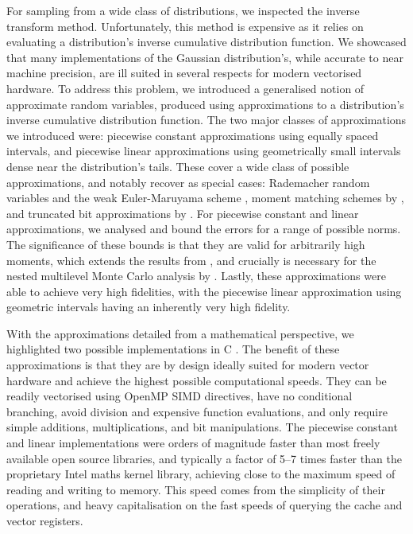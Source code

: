 \documentclass[manuscript,review]{acmart}
\begin{document}
For sampling from a wide class of distributions, we inspected the inverse transform method. Unfortunately, this method is expensive as it relies on evaluating a distribution's inverse cumulative distribution function. We showcased that many implementations of the Gaussian distribution's, while accurate to near machine precision, are ill suited in several respects for modern vectorised hardware. To address this problem, we introduced a generalised notion of approximate random variables, produced using approximations to a distribution's inverse cumulative distribution function. The two major classes of approximations we introduced were: piecewise constant approximations using equally spaced intervals, and piecewise linear approximations using geometrically small intervals dense near the distribution's tails. These cover a wide class of possible approximations, and notably recover as special cases: Rademacher random variables and the weak Euler-Maruyama scheme \citep{glasserman2013monte}, moment matching schemes by \citet{muller2015improving}, and truncated bit approximations by \citet{giles2019random_quadrature}. For piecewise constant and linear approximations, we analysed and bound the errors for a range of possible norms. The significance of these bounds is that they are valid for arbitrarily high moments, which extends the results from \citet{giles2019random_quadrature}, and crucially is necessary for the nested multilevel Monte Carlo analysis by \citet{giles2020approximate}. Lastly, these approximations were able to achieve very high fidelities, with the piecewise linear approximation using geometric intervals having an inherently very high fidelity. 

With the approximations detailed from a mathematical perspective, we highlighted two possible implementations in C \citep{sheridan2020approximate_random}. The benefit of these approximations is that they are by design ideally suited for modern vector hardware and achieve the highest possible computational speeds. They can be readily vectorised using OpenMP SIMD directives, have no conditional branching, avoid division and expensive function evaluations, and only require simple additions, multiplications, and bit manipulations. The piecewise constant and linear implementations were orders of magnitude faster than most freely available open source libraries, and typically a factor of 5--7 times faster than the proprietary Intel maths kernel library, achieving close to the maximum speed of reading and writing to memory. This speed comes from the simplicity of their operations, and heavy capitalisation on the fast speeds of querying the cache and vector registers. 
\end{document}
